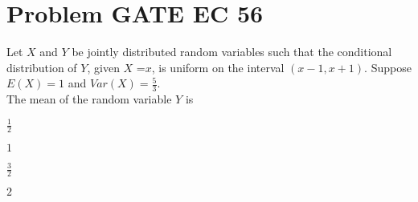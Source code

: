 \documentclass[journal,12pt,twocolumn]{IEEEtran}
\begin{document}
\section{Problem GATE EC 56}
Let $X$ and $Y$ be jointly distributed random variables such that the conditional distribution of $Y$, given $X$ =$x$, is uniform on the interval $(x-1,x+1)$. Suppose $E(X)=1$ and $Var(X)=\frac{5}{3}$.
\\
 The mean of the random variable $Y$ is 
\\
\begin{enumerate}[(A)]
\begin{multicols}{2}
\setlength\itemsep{1em}

\item $ \frac{1}{2}$\\
\item $1$\\
\item $ \frac{3}{2}$\\
\item $2$

\end{multicols}
\end{enumerate}
\end{document}
